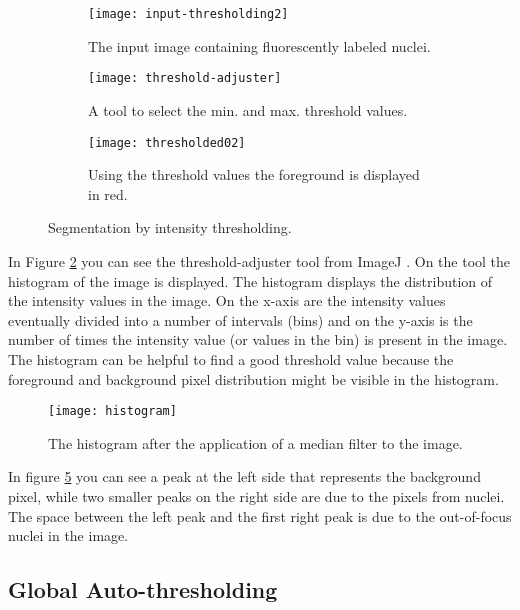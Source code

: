 \begin{figure}[h!]
  \centering
\begin{subfigure}[t]{0.3\textwidth}
    \texttt{[image: input-thresholding2]}
    \caption[Labeled nuclei]{The input image containing fluorescently labeled nuclei.}
    \label{labeled_nuclei}
\end{subfigure}  
\begin{subfigure}[t]{0.3\textwidth}
    \texttt{[image: threshold-adjuster]}
    \caption[Threshold Adjuster]{A tool to select the min. and max. threshold values.}
    \label{threshold_adjuster}
\end{subfigure}  
\begin{subfigure}[t]{0.3\textwidth}
    \texttt{[image: thresholded02]}
    \caption[Segmented image]{Using the threshold values the foreground is displayed in red.}
    \label{segmented_image}
\end{subfigure}  
   \caption{Segmentation by intensity thresholding.}
   \label{segmentation_by_thresholding}
\end{figure}

In Figure \ref{threshold_adjuster} you can see the threshold-adjuster tool from ImageJ \cite{schneider_nih_2012}. On the tool the histogram of the image is displayed. The histogram displays the distribution of the intensity values in the image. On the x-axis are the intensity values eventually divided into a number of intervals (bins) and on the y-axis is the number of times the intensity value (or values in the bin) is present in the image. The histogram can be helpful to find a good threshold value because the foreground and background pixel distribution might be visible in the histogram.

\begin{figure}[h!]
  \centering
\texttt{[image: histogram]}
    \caption[histogram]{The histogram after the application of a median filter to the image.}
    \label{histogram}
\end{figure}

In figure \ref{histogram} you can see a peak at the left side that represents the background pixel, while two smaller peaks on the right side are due to the pixels from nuclei. The space between the left peak and the first right peak is due to the out-of-focus nuclei in the image.

\subsection{Global Auto-thresholding}


